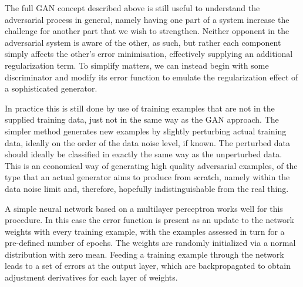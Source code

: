 \documentclass          {article} %
\begin{document}
The full GAN concept described above is still useful to understand the adversarial process in general, namely having one part of a system increase the challenge for another part that we wish to strengthen. Neither opponent in the adversarial system is aware of the other, as such, but rather each component simply affects the other's error minimisation, effectively supplying an additional regularization term. To simplify matters, we can instead begin with some discriminator and modify its error function to emulate the regularization effect of a sophisticated generator.

In practice this is still done by use of training examples that are not in the supplied training data, just not in the same way as the GAN approach. The simpler method generates new examples by slightly perturbing actual training data, ideally on the order of the data noise level, if known. The perturbed data should ideally be classified in exactly the same way as the unperturbed data. This is an economical way of generating high quality adversarial examples, of the type that an actual generator aims to produce from scratch, namely within the data noise limit and, therefore, hopefully indistinguishable from the real thing.

A simple neural network based on a multilayer perceptron works well for this procedure. In this case the error function is present as an update to the network weights with every training example, with the examples assessed in turn for a pre-defined number of epochs. The weights are randomly initialized via a normal distribution with zero mean. Feeding a training example through the network leads to a set of errors at the output layer, which are backpropagated to obtain adjustment derivatives for each layer of weights.
\end{document}
